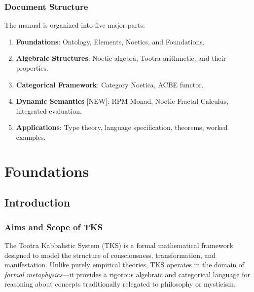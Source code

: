 \documentclass[11pt,twoside,openright]{book}
\theoremstyle{definition}
\theoremstyle{plain}
\theoremstyle{remark}
\begin{document}
\section*{Document Structure}

The manual is organized into five major parts:
\begin{enumerate}
  \item \textbf{Foundations}: Ontology, Elements, Noetics, and Foundations.
  \item \textbf{Algebraic Structures}: Noetic algebra, Tootra arithmetic, and their properties.
  \item \textbf{Categorical Framework}: Category Noetica, ACBE functor.
  \item \textbf{Dynamic Semantics} [NEW]: RPM Monad, Noetic Fractal Calculus, integrated evaluation.
  \item \textbf{Applications}: Type theory, language specification, theorems, worked examples.
\end{enumerate}

\mainmatter

\part{Foundations}

\chapter{Introduction}
\label{ch:introduction}

\section{Aims and Scope of TKS}

The Tootra Kabbalistic System (TKS) is a formal mathematical framework designed to model the structure of consciousness, transformation, and manifestation. Unlike purely empirical theories, TKS operates in the domain of \emph{formal metaphysics}---it provides a rigorous algebraic and categorical language for reasoning about concepts traditionally relegated to philosophy or mysticism.
\end{document}

